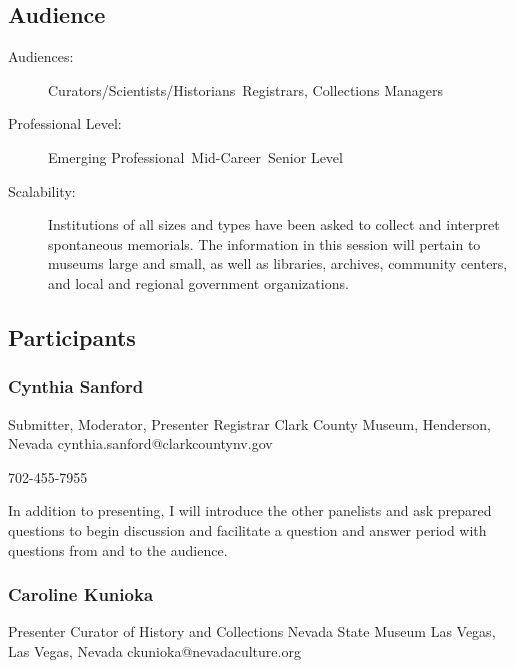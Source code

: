 \documentclass{report}
\begin{document}
              \subsection*{Audience}
                \begin{description}
                  \item [Audiences:]Curators/Scientists/Historians~Registrars, Collections Managers~
                  \item[Professional Level:]Emerging Professional~Mid-Career~Senior Level~
                \item[Scalability:] Institutions of all sizes and types have been asked to collect and interpret spontaneous memorials. The information in this session will pertain to museums large and small, as well as libraries, archives, community centers, and local and regional government organizations.

							
              \end{description}
            \subsection*{Participants}
              \subsubsection*{ Cynthia Sanford }
              Submitter, Moderator, Presenter\newline
              Registrar\newline
              Clark County Museum, Henderson, Nevada
              \newline
              cynthia.sanford@clarkcountynv.gov\newline
              
              702-455-7955\newline

              In addition to presenting, I will introduce the other panelists and ask prepared questions to begin discussion and facilitate a question and answer period with questions from and to the audience.\newline


              

              
                \subsubsection*{ Caroline Kunioka }
                Presenter\newline
                Curator of History and Collections\newline
                Nevada State Museum Las Vegas, Las Vegas, Nevada
                \newline
                ckunioka@nevadaculture.org\newline
                
\end{document}
